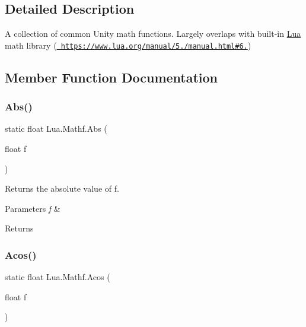 \subsection{Detailed Description}
A collection of common Unity math functions. Largely overlaps with built-\/in \mbox{\hyperlink{namespace_lua}{Lua}} math library (\href{https://www.lua.org/manual/5.3/manual.html\#6.7}{\texttt{ https\+://www.\+lua.\+org/manual/5./manual.\+html\#6.}}) 



\subsection{Member Function Documentation}
\mbox{\label{class_lua_1_1_mathf_a321380853cd01074ad91e673a7071c99}} 
\subsubsection{\texorpdfstring{Abs()}{Abs()}}
{\footnotesize\ttfamily static float Lua.\+Mathf.\+Abs (\begin{DoxyParamCaption}\item[{float}]{f }\end{DoxyParamCaption})\hspace{0.3cm}{\ttfamily [static]}}



Returns the absolute value of f. 


\begin{DoxyParams}{Parameters}
{\em f} & \\
\hline
\end{DoxyParams}
\begin{DoxyReturn}{Returns}

\end{DoxyReturn}
\mbox{\label{class_lua_1_1_mathf_a33b558ad9dabaee4792399525a89e4ce}} 
\subsubsection{\texorpdfstring{Acos()}{Acos()}}
{\footnotesize\ttfamily static float Lua.\+Mathf.\+Acos (\begin{DoxyParamCaption}\item[{float}]{f }\end{DoxyParamCaption})\hspace{0.3cm}{\ttfamily [static]}}



